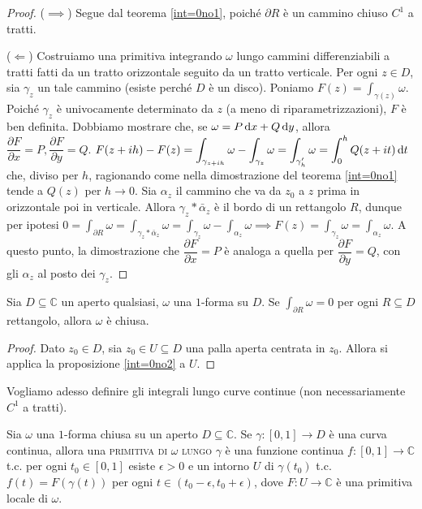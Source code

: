\begin{proof}
  ($\implies$) Segue dal teorema \ref{int=0no1}, poiché $\partial R$ è un cammino chiuso $C^1$ a tratti.

  ($\Leftarrow$) Costruiamo una primitiva integrando $\omega$ lungo cammini differenziabili a tratti fatti da un tratto orizzontale seguito da un tratto verticale. Per ogni $z \in D$, sia $\gamma_z$ un tale cammino (esiste perché $D$ è un disco). Poniamo $\displaystyle F(z)=\int_{\gamma(z)} \omega$. Poiché $\gamma_z$ è univocamente determinato da $z$ (a meno di riparametrizzazioni), $F$ è ben definita. Dobbiamo mostrare che, se $\omega=P\mathop{}\!\mathrm{d} x+Q\mathop{}\!\mathrm{d} y$, allora $\dfrac{\partial F}{\partial x}=P, \dfrac{\partial F}{\partial y}=Q$.
  $\displaystyle F(z+ih)-F(z)=\int_{\gamma_{z+ih}} \omega-\int_{\gamma_z} \omega=\int_{\gamma_h'} \omega=\int_0^h Q(z+it) \mathop{}\!\mathrm{d} t$ che, diviso per $h$, ragionando come nella dimostrazione del teorema \ref{int=0no1} tende a $Q(z)$ per $h \longrightarrow 0$. Sia $\alpha_z$ il cammino che va da $z_0$ a $z$ prima in orizzontale poi in verticale.
  Allora $\gamma_z * \bar{\alpha}_z$ è il bordo di un rettangolo $R$, dunque per ipotesi $\displaystyle 0=\int_{\partial R} \omega=\int_{\gamma_z*\bar{\alpha}_z} \omega=\int_{\gamma_z}\omega-\int_{\alpha_z} \omega \implies F(z)=\int_{\gamma_z}\omega=\int_{\alpha_z}\omega$.
  A questo punto, la dimostrazione che $\dfrac{\partial F}{\partial x}=P$ è analoga a quella per $\dfrac{\partial F}{\partial y}=Q$, con gli $\alpha_z$ al posto dei $\gamma_z$.
\end{proof}

\begin{cor} \label{intR=0}
  Sia $D \subseteq \mathbb{C}$ un aperto qualsiasi, $\omega$ una $1$-forma su $D$. Se $\displaystyle \int_{\partial R} \omega=0$ per ogni $R \subseteq D$ rettangolo, allora $\omega$ è chiusa.
\end{cor}

\begin{proof}
  Dato $z_0 \in D$, sia $z_0 \in U \subseteq D$ una palla aperta centrata in $z_0$. Allora si applica la proposizione \ref{int=0no2} a $U$.
\end{proof}

Vogliamo adesso definire gli integrali lungo curve continue (non necessariamente $C^1$ a tratti).

\begin{defn} \label{prim_gamma}
  Sia $\omega$ una $1$-forma chiusa su un aperto $D \subseteq \mathbb{C}$. Se $\gamma:[0, 1] \longrightarrow D$ è una curva continua, allora una \textsc{primitiva di $\omega$ lungo $\gamma$} è una funzione continua $f:[0, 1] \longrightarrow \mathbb{C}$ t.c. per ogni $t_0 \in [0, 1]$ esiste $\epsilon>0$ e un intorno $U$ di $\gamma(t_0)$ t.c.
  $f(t)=F(\gamma(t))$ per ogni $t \in (t_0-\epsilon, t_0+\epsilon)$, dove $F:U \longrightarrow \mathbb{C}$ è una primitiva locale di $\omega$.
\end{defn}

